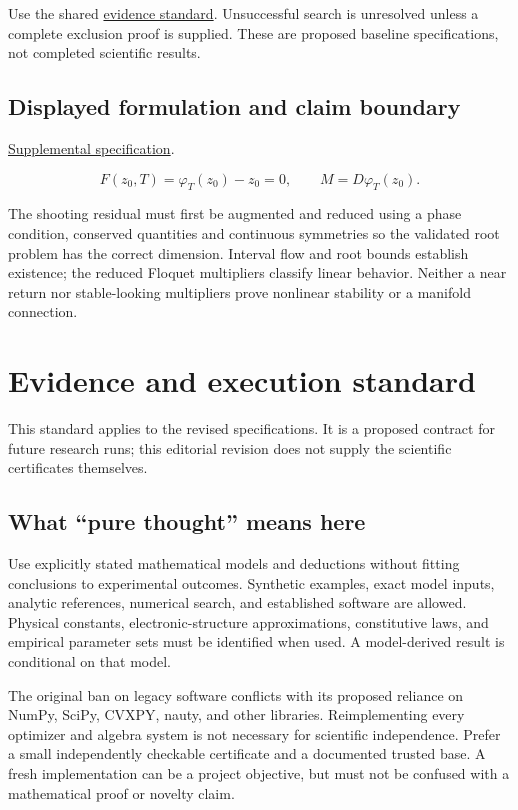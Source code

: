 \documentclass[
  11pt,
]{article}
\begin{document}
Use the shared
\href{https://github.com/rick-stevens-ai/Pure-Thought/blob/main/reviews/EVIDENCE-STANDARD.md}{evidence
standard}. Unsuccessful search is unresolved unless a complete exclusion
proof is supplied. These are proposed baseline specifications, not
completed scientific results.

\subsection{Displayed formulation and claim boundary}

\href{https://github.com/rick-stevens-ai/Pure-Thought/blob/main/supplemental/S10.md}{Supplemental
specification}.

\[F(z_0,T)=\varphi_T(z_0)-z_0=0,\qquad
M=D\varphi_T(z_0).\]

The shooting residual must first be augmented and reduced using a phase
condition, conserved quantities and continuous symmetries so the
validated root problem has the correct dimension. Interval flow and root
bounds establish existence; the reduced Floquet multipliers classify
linear behavior. Neither a near return nor stable-looking multipliers
prove nonlinear stability or a manifold connection.

\section{Evidence and execution standard}

This standard applies to the revised specifications. It is a proposed
contract for future research runs; this editorial revision does not
supply the scientific certificates themselves.

\subsection{What ``pure thought'' means here}

Use explicitly stated mathematical models and deductions without fitting
conclusions to experimental outcomes. Synthetic examples, exact model
inputs, analytic references, numerical search, and established software
are allowed. Physical constants, electronic-structure approximations,
constitutive laws, and empirical parameter sets must be identified when
used. A model-derived result is conditional on that model.

The original ban on legacy software conflicts with its proposed reliance
on NumPy, SciPy, CVXPY, nauty, and other libraries. Reimplementing every
optimizer and algebra system is not necessary for scientific
independence. Prefer a small independently checkable certificate and a
documented trusted base. A fresh implementation can be a project
objective, but must not be confused with a mathematical proof or novelty
claim.
\end{document}
